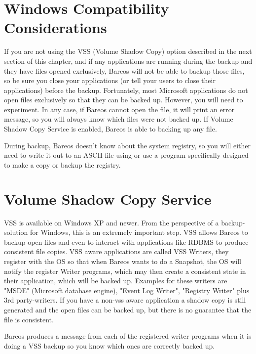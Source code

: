 \label{Compatibility}
\section{Windows Compatibility Considerations}

If you are not using the VSS (Volume Shadow Copy) option described in the
next section of this chapter, and if any applications are running during
the backup and they have files opened exclusively, Bareos will not be able
to backup those files, so be sure you close your applications (or tell your
users to close their applications) before the backup.  Fortunately, most
Microsoft applications do not open files exclusively so that they can be
backed up.  However, you will need to experiment.  In any case, if Bareos
cannot open the file, it will print an error message, so you will always
know which files were not backed up.
If Volume Shadow Copy Service is enabled, Bareos is able to backing up any
file.

During backup, Bareos doesn't know about the system registry, so you will
either need to write it out to an ASCII file using  or use a
program specifically designed to make a copy or backup the registry.



\section{Volume Shadow Copy Service}
\label{VSS}

VSS is available on Windows XP and newer. From the perspective of
a backup-solution for Windows, this is an extremely important step. VSS
allows Bareos to backup open files and even to interact with applications like
RDBMS to produce consistent file copies. VSS aware applications are called
VSS Writers, they register with the OS so that when Bareos wants to do a
Snapshot, the OS will notify the register Writer programs, which may then
create a consistent state in their application, which will be backed up.
Examples for these writers are "MSDE" (Microsoft database
engine), "Event Log Writer", "Registry Writer" plus 3rd
party-writers.  If you have a non-vss aware application a shadow copy is still generated
and the open files can be backed up, but there is no guarantee
that the file is consistent.

Bareos produces a message from each of the registered writer programs
when it is doing a VSS backup so you know which ones are correctly backed
up.

